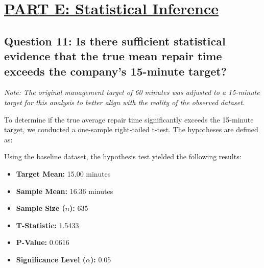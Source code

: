 \section*{\underline{PART E: Statistical Inference}}

\subsection*{Question 11: Is there sufficient statistical evidence that the true mean repair time exceeds the company's 15-minute target?}

\textit{Note: The original management target of 60 minutes was adjusted to a 15-minute target for this analysis to better align with the reality of the observed dataset.}

To determine if the true average repair time significantly exceeds the 15-minute target, we conducted a one-sample right-tailed t-test. The hypotheses are defined as:


\begin{center}
\end{center}



Using the baseline dataset, the hypothesis test yielded the following results:
\begin{itemize}
    \item \textbf{Target Mean:} 15.00 minutes
    \item \textbf{Sample Mean:} 16.36 minutes
    \item \textbf{Sample Size ($n$):} 635
    \item \textbf{T-Statistic:} 1.5433
    \item \textbf{P-Value:} 0.0616
    \item \textbf{Significance Level ($\alpha$):} 0.05
\end{itemize}



